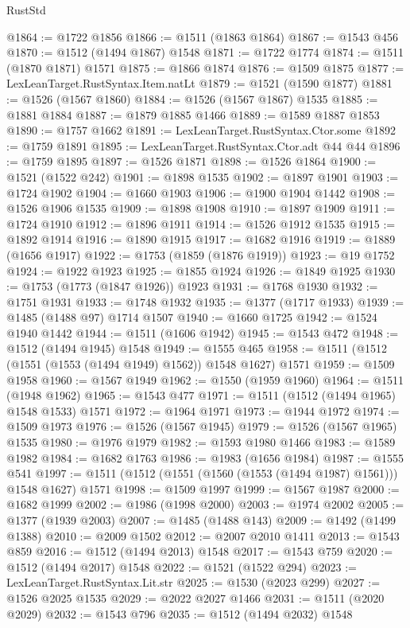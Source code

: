 \begin{lexlean}{RustStd}
\begin{coremodule}
{{@1864 := @1722 @1856
@1866 := @1511 (@1863 @1864)
@1867 := @1543 @456
@1870 := @1512 (@1494 @1867) @1548
@1871 := @1722 @1774
@1874 := @1511 (@1870 @1871) @1571
@1875 := @1866 @1874
@1876 := @1509 @1875
@1877 := LexLeanTarget.RustSyntax.Item.natLt
@1879 := @1521 (@1590 @1877)
@1881 := @1526 (@1567 @1860)
@1884 := @1526 (@1567 @1867) @1535
@1885 := @1881 @1884
@1887 := @1879 @1885 @1466
@1889 := @1589 @1887 @1853
@1890 := @1757 @1662
@1891 := LexLeanTarget.RustSyntax.Ctor.some
@1892 := @1759 @1891
@1895 := LexLeanTarget.RustSyntax.Ctor.adt @44 @44
@1896 := @1759 @1895
@1897 := @1526 @1871
@1898 := @1526 @1864
@1900 := @1521 (@1522 @242)
@1901 := @1898 @1535
@1902 := @1897 @1901
@1903 := @1724 @1902
@1904 := @1660 @1903
@1906 := @1900 @1904 @1442
@1908 := @1526 @1906 @1535
@1909 := @1898 @1908
@1910 := @1897 @1909
@1911 := @1724 @1910
@1912 := @1896 @1911
@1914 := @1526 @1912 @1535
@1915 := @1892 @1914
@1916 := @1890 @1915
@1917 := @1682 @1916
@1919 := @1889 (@1656 @1917)
@1922 := @1753 (@1859 (@1876 @1919))
@1923 := @19 @1752
@1924 := @1922 @1923
@1925 := @1855 @1924
@1926 := @1849 @1925
@1930 := @1753 (@1773 (@1847 @1926)) @1923
@1931 := @1768 @1930
@1932 := @1751 @1931
@1933 := @1748 @1932
@1935 := @1377 (@1717 @1933)
@1939 := @1485 (@1488 @97) @1714 @1507
@1940 := @1660 @1725
@1942 := @1524 @1940 @1442
@1944 := @1511 (@1606 @1942)
@1945 := @1543 @472
@1948 := @1512 (@1494 @1945) @1548
@1949 := @1555 @465
@1958 := @1511 (@1512 (@1551 (@1553 (@1494 @1949) @1562)) @1548 @1627) @1571
@1959 := @1509 @1958
@1960 := @1567 @1949
@1962 := @1550 (@1959 @1960)
@1964 := @1511 (@1948 @1962)
@1965 := @1543 @477
@1971 := @1511 (@1512 (@1494 @1965) @1548 @1533) @1571
@1972 := @1964 @1971
@1973 := @1944 @1972
@1974 := @1509 @1973
@1976 := @1526 (@1567 @1945)
@1979 := @1526 (@1567 @1965) @1535
@1980 := @1976 @1979
@1982 := @1593 @1980 @1466
@1983 := @1589 @1982
@1984 := @1682 @1763
@1986 := @1983 (@1656 @1984)
@1987 := @1555 @541
@1997 := @1511 (@1512 (@1551 (@1560 (@1553 (@1494 @1987) @1561))) @1548 @1627) @1571
@1998 := @1509 @1997
@1999 := @1567 @1987
@2000 := @1682 @1999
@2002 := @1986 (@1998 @2000)
@2003 := @1974 @2002
@2005 := @1377 (@1939 @2003)
@2007 := @1485 (@1488 @143)
@2009 := @1492 (@1499 @1388)
@2010 := @2009 @1502
@2012 := @2007 @2010 @1411
@2013 := @1543 @859
@2016 := @1512 (@1494 @2013) @1548
@2017 := @1543 @759
@2020 := @1512 (@1494 @2017) @1548
@2022 := @1521 (@1522 @294)
@2023 := LexLeanTarget.RustSyntax.Lit.str
@2025 := @1530 (@2023 @299)
@2027 := @1526 @2025 @1535
@2029 := @2022 @2027 @1466
@2031 := @1511 (@2020 @2029)
@2032 := @1543 @796
@2035 := @1512 (@1494 @2032) @1548
}}
\end{coremodule}
\end{lexlean}
